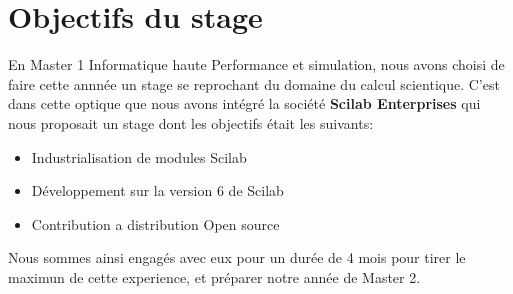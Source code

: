 \section*{Objectifs du stage}
En Master 1 Informatique haute Performance et simulation, nous avons choisi de faire cette annnée
un stage se reprochant du domaine du calcul scientique. C'est dans cette optique que nous avons
intégré la société {\bf Scilab Enterprises} qui nous proposait un stage dont les objectifs était 
les suivants:
\begin{itemize}
\item Industrialisation de modules Scilab
\item Développement sur la version 6 de Scilab
\item Contribution a distribution Open source
\end{itemize}
Nous sommes ainsi engagés avec eux pour un durée de 4 mois pour tirer le maximun de cette experience,
et préparer notre année de Master 2.

